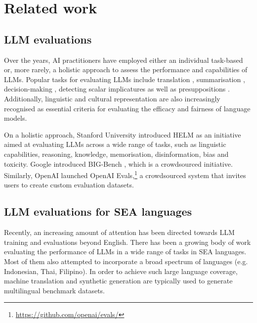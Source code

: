 \section{Related work}
\subsection{LLM evaluations}
Over the years, AI practitioners have employed either an individual task-based or, more rarely, a holistic approach to assess the performance and capabilities of LLMs. Popular tasks for evaluating LLMs include translation \cite{hendy_how_2023}, summarisation \cite{zhang_benchmarking_2023}, decision-making \citep{shen_hugginggpt_2023}, detecting scalar implicatures \citep{jeretic_are_2020,pandia_pragmatic_2021,hu_expectations_2023, liu_adjective_2023} as well as presuppositions \citep{jeretic_are_2020,parrish_nope_2021}. Additionally, linguistic \citep{warstadt_blimp_2020, xiang_climp_2021,someya-oseki-2023-jblimp} and cultural representation \citep{durmus_towards_2023, atari2023humans} are also increasingly recognised as essential criteria for evaluating the efficacy and fairness of language models. 

On a holistic approach, Stanford University introduced HELM \citep{liang_holistic_2022} as an initiative aimed at evaluating LLMs across a wide range of tasks, such as linguistic capabilities, reasoning, knowledge, memorisation, disinformation, bias and toxicity. Google introduced BIG-Bench \citep{srivastava_beyond_2023}, which is a crowdsourced initiative. Similarly, OpenAI launched OpenAI Evals,\footnote{\url{https://github.com/openai/evals/}} a crowdsourced system that invites users to create custom evaluation datasets.

\subsection{LLM evaluations for SEA languages}

Recently, an increasing amount of attention has been directed towards LLM training and evaluations beyond English. There has been a growing body of work \citep{sailor2report,zhang2024seallms,bai2023qwen,dang2024aya} evaluating the performance of LLMs in a wide range of tasks in SEA languages. Most of them also attempted to incorporate a broad spectrum of languages (e.g. Indonesian, Thai, Filipino). In order to achieve such large language coverage, machine translation and synthetic generation are typically used to generate multilingual benchmark datasets.

